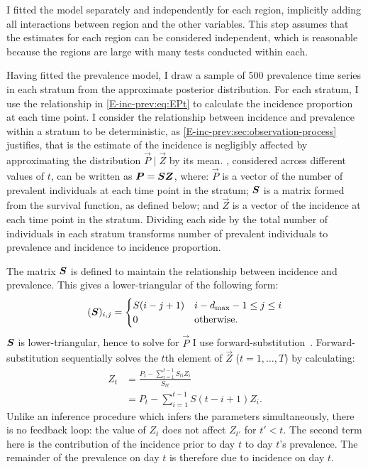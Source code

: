 \documentclass[thesis.tex]{subfiles}
\begin{document}
I fitted the model separately and independently for each region, implicitly adding all interactions between region and the other variables.
This step assumes that the estimates for each region can be considered independent, which is reasonable because the regions are large with many tests conducted within each.

Having fitted the prevalence model, I draw a sample of 500 prevalence time series in each stratum from the approximate posterior distribution.
For each stratum, I use the relationship in \cref{E-inc-prev:eq:EPt} to calculate the incidence proportion at each time point.
I consider the relationship between incidence and prevalence within a stratum to be deterministic, as \cref{E-inc-prev:sec:observation-process} justifies, that is the estimate of the incidence is negligibly affected by approximating the distribution $\vec{P} \mid \vec{Z}$ by its mean.
, considered across different values of $t$, can be written as $\bm{P} = \bm{S} \bm{Z}$, where: $\vec{P}$ is a vector of the number of prevalent individuals at each time point in the stratum; $\bm{S}$ is a matrix formed from the survival function, as defined below; and $\vec{Z}$ is a vector of the incidence at each time point in the stratum.
Dividing each side by the total number of individuals in each stratum transforms number of prevalent individuals to prevalence and incidence to incidence proportion.

The matrix $\bm{S}$ is defined to maintain the relationship between incidence and prevalence.
This gives a lower-triangular of the following form:
\begin{align}
    (\bm{S})_{i,j} = \begin{cases}
        S(i - j + 1) & i - d_\text{max} - 1 \leq j \leq i \\
        0 & \text{otherwise.}
    \end{cases}
\end{align}
$\bm{S}$ is lower-triangular, hence to solve for $\vec{P}$ I use forward-substitution~\autocite{cormenMatrix}.
Forward-substitution sequentially solves the $t$th element of $\vec{Z}$ ($t = 1, \dots, T$) by calculating:
\begin{align}
Z_t
&= \frac{P_t - \sum_{i=1}^{t-1} S_{ti} Z_i}{S_{tt}} \\
&= P_t - \sum_{i=1}^{t-1} S(t - i + 1) Z_i.
\label{transmission:eq:forward-substitute}
\end{align}
Unlike an inference procedure which infers the parameters simultaneously, there is no feedback loop: the value of $Z_{t}$ does not affect $Z_{t'}$ for $t' < t$.
The second term here is the contribution of the incidence prior to day $t$ to day $t$'s prevalence.
The remainder of the prevalence on day $t$ is therefore due to incidence on day $t$.
\end{document}
